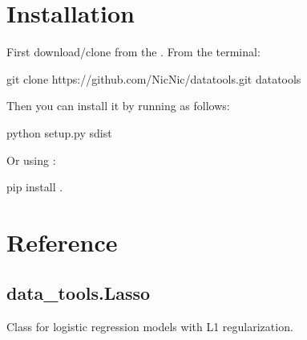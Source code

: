 \documentclass[letterpaper,10pt,english]{sphinxmanual}
\begin{document}
\chapter{Installation}
\label{\detokenize{index:installation}}
First download/clone  from the
.
From the terminal:

%
\begin{sphinxVerbatim}[commandchars=\\\{\}]
git clone https://github.com/Nic\PYGZhy{}Nic/data\PYGZus{}tools.git
 data\PYGZus{}tools
\end{sphinxVerbatim}

Then you can install it by running  as follows:

%
\begin{sphinxVerbatim}[commandchars=\\\{\}]
python setup.py sdist
\end{sphinxVerbatim}

Or using :

%
\begin{sphinxVerbatim}[commandchars=\\\{\}]
pip install .
\end{sphinxVerbatim}


\chapter{Reference}
\label{\detokenize{index:reference}}\label{\detokenize{Lasso:module-data_tools.Lasso}}

\section{data\_tools.Lasso}
\label{\detokenize{Lasso::doc}}\label{\detokenize{Lasso:data-tools-lasso}}
Class for logistic regression models with L1 regularization.
\end{document}
